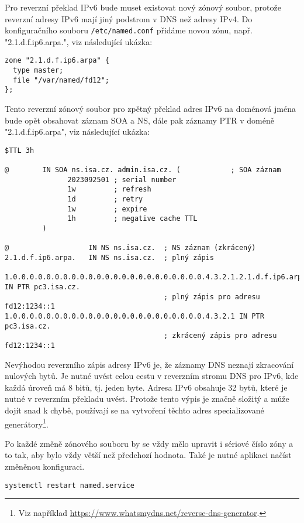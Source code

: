 Pro reverzní překlad IPv6 bude muset existovat nový zónový soubor, protože reverzní adresy IPv6 mají jiný podstrom v DNS než adresy IPv4. Do konfiguračního souboru {\tt /etc/named.conf} přidáme novou zónu, např. "2.1.d.f.ip6.arpa.", viz následující ukázka:
\begin{verbatim}
zone "2.1.d.f.ip6.arpa" {
  type master;
  file "/var/named/fd12";
};
\end{verbatim} 
Tento reverzní zónový soubor pro zpětný překlad adres IPv6 na doménová jména bude opět obsahovat záznam SOA a NS, dále pak záznamy PTR v doméně  "2.1.d.f.ip6.arpa", viz následující ukázka: 
\begin{verbatim}
$TTL 3h

@        IN SOA ns.isa.cz. admin.isa.cz. (            ; SOA záznam
               2023092501 ; serial number
               1w         ; refresh
               1d         ; retry 
               1w         ; expire
               1h         ; negative cache TTL
         )

@                   IN NS ns.isa.cz.  ; NS záznam (zkrácený)
2.1.d.f.ip6.arpa.   IN NS ns.isa.cz.  ; plný zápis

1.0.0.0.0.0.0.0.0.0.0.0.0.0.0.0.0.0.0.0.0.0.0.0.4.3.2.1.2.1.d.f.ip6.arpa. IN PTR pc3.isa.cz.
                                      ; plný zápis pro adresu fd12:1234::1
1.0.0.0.0.0.0.0.0.0.0.0.0.0.0.0.0.0.0.0.0.0.0.0.4.3.2.1 IN PTR pc3.isa.cz.
                                      ; zkrácený zápis pro adresu fd12:1234::1
\end{verbatim}
Nevýhodou reverzního zápis adresy IPv6 je, že záznamy DNS neznají zkracování nulových bytů. Je nutné uvést celou cestu v reverzním stromu DNS pro IPv6, kde každá úroveň má 8 bitů, tj. jeden byte. Adresa IPv6 obsahuje 32 bytů, které je nutné v reverzním překladu uvést. Protože tento výpis je značně složitý a může dojít snad k chybě, používají se na vytvoření těchto adres specializované generátory\footnote{Viz například \url{https://www.whatsmydns.net/reverse-dns-generator}.}. 

Po každé změně zónového souboru by se vždy mělo upravit i sériové číslo zóny a to tak, aby bylo vždy větší než předchozí hodnota. Také je nutné aplikaci načíst změněnou konfiguraci.
\begin{verbatim}
systemctl restart named.service
\end{verbatim}

